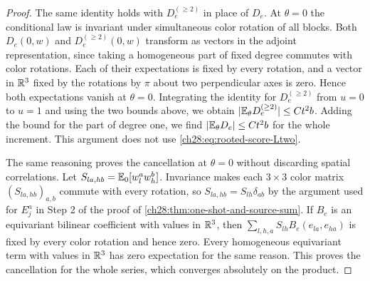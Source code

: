 \begin{proof}
The same identity holds with $D_e^{(\ge2)}$ in place of $D_e$. At $\theta=0$ the conditional law is invariant under simultaneous color rotation of all blocks. Both $D_e(0,w)$ and $D_e^{(\ge2)}(0,w)$ transform as vectors in the adjoint representation, since taking a homogeneous part of fixed degree commutes with color rotations. Each of their expectations is fixed by every rotation, and a vector in $\mathbb R^3$ fixed by the rotations by $\pi$ about two perpendicular axes is zero. Hence both expectations vanish at $\theta=0$. Integrating the identity for $D_e^{(\ge2)}$ from $u=0$ to $u=1$ and using the two bounds above, we obtain $|\mathbb E_\theta D_e^{(\ge2)}|\le Ct^2b$. Adding the bound for the part of degree one, we find $|\mathbb E_\theta D_e|\le Ct^2b$ for the whole increment. This argument does not use \eqref{ch28:eq:rooted-score-Ltwo}.

The same reasoning proves the cancellation at $\theta=0$ without discarding spatial correlations. Let $S_{la,hb}=\mathbb E_0[w_l^aw_h^b]$. Invariance makes each $3\times3$ color matrix $(S_{la,hb})_{a,b}$ commute with every rotation, so $S_{la,hb}=S_{lh}\delta_{ab}$ by the argument used for $E_j^a$ in Step 2 of the proof of \cref{ch28:thm:one-shot-and-source-sum}. If $B_e$ is an equivariant bilinear coefficient with values in $\mathbb R^3$, then $\sum_{l,h,a}S_{lh}B_e(e_{la},e_{ha})$ is fixed by every color rotation and hence zero. Every homogeneous equivariant term with values in $\mathbb R^3$ has zero expectation for the same reason. This proves the cancellation for the whole series, which converges absolutely on the product.


\end{proof}
